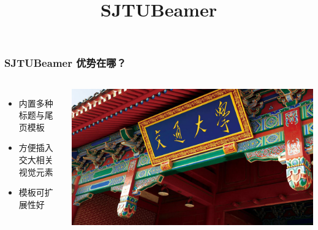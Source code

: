 \documentclass[aspectratio=169,draft]{ctexbeamer}
\begin{document}
\title{SJTUBeamer}
\begin{frame}
  \frametitle{SJTUBeamer 优势在哪？}
  \begin{columns}
    \begin{itemize}
      \item 内置多种标题与尾页模板
      \item 方便插入交大相关视觉元素
      \item 模板可扩展性好
    \end{itemize}
    \includegraphics[width=\textwidth]{vi/sjtu-vi-sjtuphoto.jpg}
  \end{columns}
\end{frame}
\end{document}
